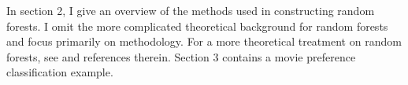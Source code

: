In section 2, I give an overview of the methods used in constructing random forests. I omit the more complicated theoretical background for random forests and focus primarily on methodology. For a more theoretical treatment on random forests, see \cite{breiman:2001} and references therein. Section 3 contains a movie preference classification example.
